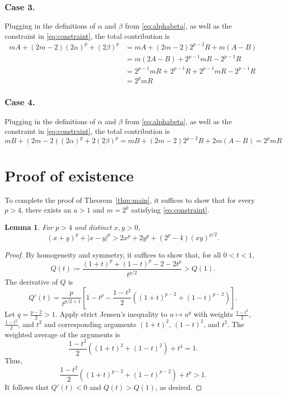 \documentclass[11pt,reqno]{amsart}
\theoremstyle{plain}
\newtheorem{lemma}[theorem]{Lemma}
\theoremstyle{definition}
\theoremstyle{remark}
\numberwithin{equation}{section}
\begin{document}
\subsubsection*{Case 3.}
Plugging in the definitions of $\alpha$ and $\beta$ from \eqref{eq:alphabeta}, as well as the constraint in \eqref{eq:constraint}, the total contribution is
\begin{align*}
    mA+(2m-2)(2\alpha)^p+(2\beta)^p &= mA+(2m-2)2^{p-2}R+m(A-B)\\
    &= m(2A-B)+2^{p-1}mR-2^{p-1}R\\
    &= 2^{p-1}mR+2^{p-1}R+2^{p-1}mR-2^{p-1}R\\
    &= 2^pmR
\end{align*}

\subsubsection*{Case 4.}
Plugging in the definitions of $\alpha$ and $\beta$ from \eqref{eq:alphabeta}, as well as the constraint in \eqref{eq:constraint}, the total contribution is
\[mB+(2m-2)(2\alpha)^p+2(2\beta)^p=mB+(2m-2)2^{p-2}R+2m(A-B)=2^pmR\]

\section{Proof of existence}\label{sec:existence}
To complete the proof of Theorem~\ref{thm:main}, it suffices to show that for every $p>4$, there exists an $a>1$ and $m=2^k$ satisfying \eqref{eq:constraint}.
\begin{lemma}\label{lem:power-ineq}
For $p>4$ and distinct $x,y>0$,
\[(x+y)^p+|x-y|^p>2x^p+2y^p+(2^p-4)(xy)^{p/2}.\]
\end{lemma}

\begin{proof}
By homogeneity and symmetry, it suffices to show that, for all $0<t<1$,
\[Q(t)\coloneqq\frac{(1+t)^p+(1-t)^p-2-2t^p}{t^{p/2}}>Q(1).\]
The derivative of $Q$ is
\[Q'(t)=\frac{p}{t^{p/2+1}}\left[1-t^p-\frac{1-t^2}{2}\left((1+t)^{p-2}+(1-t)^{p-2}\right)\right].\]
Let $q=\frac{p-2}{2}>1$. Apply strict Jensen's inequality to $u\mapsto u^q$
with weights $\frac{1-t^2}{2}$, $\frac{1-t^2}{2}$, and $t^2$
and corresponding arguments $(1+t)^2$, $(1-t)^2$, and $t^2$. The weighted average of the arguments is
\[\frac{1-t^2}{2}\left((1+t)^2+(1-t)^2\right)+t^4=1.\]
Thus,
\[\frac{1-t^2}{2}\left((1+t)^{p-2}+(1-t)^{p-2}\right)+t^p>1.\]
It follows that $Q'(t)<0$ and $Q(t)>Q(1)$, as desired.
\end{proof}
\end{document}
